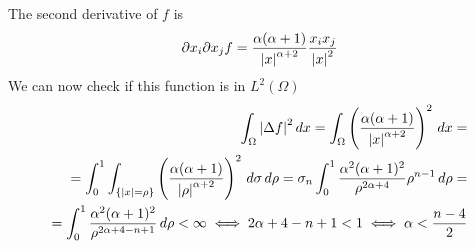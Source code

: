The second derivative of \(f\) is
\[
    \begin{split}
        \partial x_i \partial x_j f = \frac{\alpha(\alpha + 1)}{\abs{x}^{\alpha + 2}} \frac{x_i x_j}{\abs{x}^2}
    \end{split}
\]
We can now check if this function is in \(L^2(\Omega)\)
\[
    \begin{split}
        \int_\Omega \abs{\Delta f}^2 \, dx = \int_\Omega \left(\frac{\alpha(\alpha + 1)}{\abs{x}^{\alpha + 2}}\right)^2 \, dx = \\
        = \int_0^1 \int_{\left\{\abs{x} = \rho\right\}} \left(\frac{\alpha(\alpha + 1)}{\abs{\rho}^{\alpha + 2}}\right)^2 \, d\sigma \, d\rho = \sigma_n \int_0^1 \frac{\alpha^2(\alpha + 1)^2}{\rho^{2\alpha + 4}} \rho^{n-1} \, d\rho = \\
        = \int_0^1 \frac{\alpha^2(\alpha + 1)^2}{\rho^{2\alpha + 4 - n + 1}} \, d\rho < \infty \iff 2\alpha + 4 - n + 1 < 1 \iff \alpha < \frac{n - 4}{2}
    \end{split}
\]

